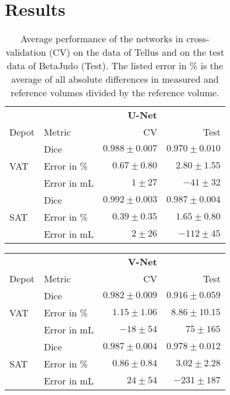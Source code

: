 \documentclass[10pt,letterpaper]{article}
\begin{document}
	
	\section*{Results}
	
	
	\begin{table}[H]
		\centering
		\caption{Average performance of the networks in cross-validation (CV) on the data of Tellus and on the test data of BetaJudo (Test). The listed error in \% is the average of all absolute differences in measured and reference volumes divided by the reference volume.}
		\vspace{0.5cm}
		\label{table_unet}
		\begin{tabular}{llrr}
			\hline
			& & \textbf{U-Net} &  \\
			Depot & Metric & CV & Test \\
			\hline
			& Dice & $0.988 \pm 0.007$ & $0.970 \pm 0.010$  \\
			VAT	& Error in \% & $0.67 \pm 0.80$ & $2.80 \pm 1.55$  \\
			& Error in mL & $1 \pm 27$ & $-41 \pm 32$ \\
			\hline
			& Dice & $0.992 \pm 0.003$ & $0.987 \pm 0.004$  \\
			SAT	& Error in \% & $0.39 \pm 0.35$ & $1.65 \pm 0.80$  \\
			& Error in mL & $2 \pm 26$ & $-112 \pm 45$ \\
			\hline
		\end{tabular}
	\end{table}	
	
	\begin{table}[H]
		\centering
		
		\label{table_vnet}
		\begin{tabular}{llrr}
			\hline
			& & \textbf{V-Net} &  \\
			Depot & Metric & CV & Test \\
			\hline
			& Dice & $0.982 \pm 0.009$ & $0.916 \pm 0.059$  \\
			VAT	& Error in \% & $1.15 \pm 1.06$ & $8.86 \pm 10.15$ \\
			& Error in mL & $-18 \pm 54$ & $75 \pm 165$ \\
			\hline
			& Dice & $0.987 \pm 0.004$ & $0.978 \pm 0.012$ \\
			SAT	& Error in \% & $0.86 \pm 0.84$ & $3.02 \pm 2.28$  \\
			& Error in mL & $24 \pm 54$ & $-231 \pm 187$  \\
			\hline
		\end{tabular}
	\end{table}	
		
\end{document}
